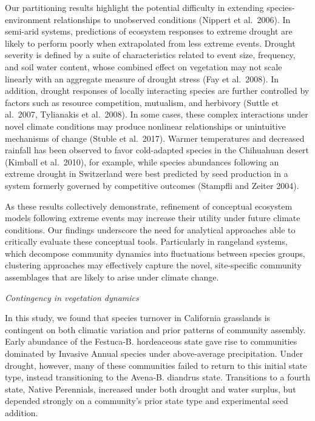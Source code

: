 \documentclass[twoside,12pt,final]{ucthesis-CA2012}
\begin{document}
\begin{ucmainmatter}
Our partitioning results highlight the potential difficulty in extending species-environment relationships to unobserved conditions (Nippert et al.~2006).
In semi-arid systems, predictions of ecosystem responses to extreme drought are likely to perform poorly when extrapolated from less extreme events.
Drought severity is defined by a suite of characteristics related to event size, frequency, and soil water content, whose combined effect on vegetation may not scale linearly with an aggregate measure of drought stress (Fay et al.~2008).
In addition, drought responses of locally interacting species are further controlled by factors such as resource competition, mutualism, and herbivory (Suttle et al.~2007, Tylianakis et al.~2008).
In some cases, these complex interactions under novel climate conditions may produce nonlinear relationships or unintuitive mechanisms of change (Stuble et al.~2017).
Warmer temperatures and decreased rainfall has been observed to favor cold-adapted species in the Chihuahuan desert (Kimball et al.~2010), for example, while species abundances following an extreme drought in Switzerland were best predicted by seed production in a system formerly governed by competitive outcomes (Stampfli and Zeiter 2004).

As these results collectively demonstrate, refinement of conceptual ecosystem models following extreme events may increase their utility under future climate conditions.
Our findings underscore the need for analytical approaches able to critically evaluate these conceptual tools.
Particularly in rangeland systems, which decompose community dynamics into fluctuations between species groups, clustering approaches may effectively capture the novel, site-specific community assemblages that are likely to arise under climate change.

\emph{Contingency in vegetation dynamics}

In this study, we found that species turnover in California grasslands is contingent on both climatic variation and prior patterns of community assembly.
Early abundance of the Festuca-B. hordeaceous state gave rise to communities dominated by Invasive Annual species under above-average precipitation.
Under drought, however, many of these communities failed to return to this initial state type, instead transitioning to the Avena-B. diandrus state.
Transitions to a fourth state, Native Perennials, increased under both drought and water surplus, but depended strongly on a community's prior state type and experimental seed addition.


\end{ucmainmatter}
\end{document}

